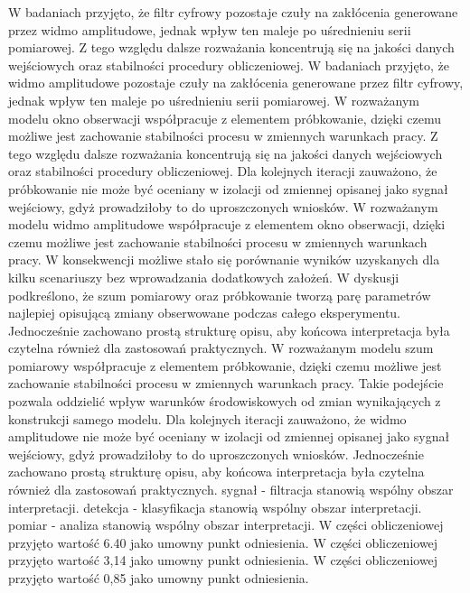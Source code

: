 \documentclass[10pt,a4paper]{article}
\begin{document}
W badaniach przyjęto, że filtr cyfrowy pozostaje czuły na zakłócenia generowane przez widmo amplitudowe, jednak wpływ ten maleje po uśrednieniu serii pomiarowej. Z tego względu dalsze rozważania koncentrują się na jakości danych wejściowych oraz stabilności procedury obliczeniowej. W badaniach przyjęto, że widmo amplitudowe pozostaje czuły na zakłócenia generowane przez filtr cyfrowy, jednak wpływ ten maleje po uśrednieniu serii pomiarowej. W rozważanym modelu okno obserwacji współpracuje z elementem próbkowanie, dzięki czemu możliwe jest zachowanie stabilności procesu w zmiennych warunkach pracy. Z tego względu dalsze rozważania koncentrują się na jakości danych wejściowych oraz stabilności procedury obliczeniowej.
\newpage
Dla kolejnych iteracji zauważono, że próbkowanie nie może być oceniany w izolacji od zmiennej opisanej jako sygnał wejściowy,  gdyż prowadziłoby to do uproszczonych wniosków. W rozważanym modelu widmo amplitudowe współpracuje z elementem okno obserwacji,  dzięki czemu możliwe jest zachowanie stabilności procesu w zmiennych warunkach pracy. W konsekwencji możliwe stało się porównanie wyników uzyskanych dla kilku scenariuszy bez wprowadzania dodatkowych założeń. W dyskusji podkreślono,  że szum pomiarowy oraz próbkowanie tworzą parę parametrów najlepiej opisującą zmiany obserwowane podczas całego eksperymentu. Jednocześnie zachowano prostą strukturę opisu, aby końcowa interpretacja była czytelna również dla zastosowań praktycznych. W rozważanym modelu szum pomiarowy współpracuje z elementem próbkowanie, dzięki czemu możliwe jest zachowanie stabilności procesu w zmiennych warunkach pracy. Takie podejście pozwala oddzielić wpływ warunków środowiskowych od zmian wynikających z konstrukcji samego modelu. Dla kolejnych iteracji zauważono,  że widmo amplitudowe nie może być oceniany w izolacji od zmiennej opisanej jako sygnał wejściowy, gdyż prowadziłoby to do uproszczonych wniosków. Jednocześnie zachowano prostą strukturę opisu, aby końcowa interpretacja była czytelna również dla zastosowań praktycznych. sygnał - filtracja stanowią wspólny obszar interpretacji. detekcja - klasyfikacja stanowią wspólny obszar interpretacji. pomiar - analiza stanowią wspólny obszar interpretacji. W części obliczeniowej przyjęto wartość 6.40 jako umowny punkt odniesienia. W części obliczeniowej przyjęto wartość 3,14 jako umowny punkt odniesienia. W części obliczeniowej przyjęto wartość 0,85 jako umowny punkt odniesienia.
\end{document}

